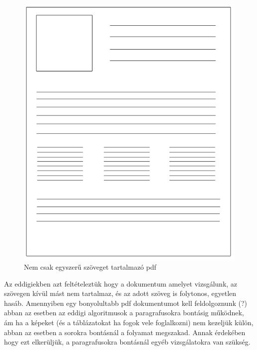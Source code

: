 
\begin{figure}[H]
\centering
\includegraphics[scale=1]{images/page.png}
\caption{Nem csak egyszerű szöveget tartalmazó pdf}
\label{fig:page}
\end{figure}

Az eddigiekben azt feltételeztük hogy a dokumentum amelyet vizsgálunk, az szövegen kívül mást nem tartalmaz, és az adott szöveg is folytonos, egyetlen hasáb. Amennyiben egy bonyolultabb pdf dokumentumot kell feldolgoznunk (?) abban az esetben az eddigi algoritmusok a paragrafusokra bontásig működnek, ám ha a képeket (és a táblázatokat ha fogok vele foglalkozni) nem kezeljük külön, abban az esetben a sorokra bontásnál a folyamat megszakad. Annak érdekében hogy ezt elkerüljük, a paragrafusokra bontásnál egyéb vizsgálatokra van szükség.

